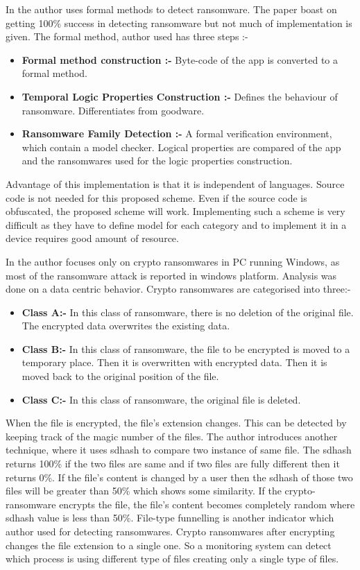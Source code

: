 \par In \cite{mercaldo2016} the author uses formal methods to detect ransomware. 
The paper boast on getting 100\% success in detecting ransomware but not much of implementation is given. 
The formal method, author used has three steps :-
\begin{itemize}
    \item \textbf{Formal method construction :-} Byte-code of the app is converted to a formal method.
    \item \textbf{Temporal Logic Properties Construction :-} Defines the behaviour of ransomware. Differentiates from goodware. 
    \item \textbf{Ransomware Family Detection :-} A formal verification environment, which contain a model checker. Logical properties are compared of the app and the ransomwares used for the logic properties construction.
\end{itemize}
Advantage of this implementation is that it is independent of languages. 
Source code is not needed for this proposed scheme.
Even if the source code is obfuscated, the proposed scheme will work.
Implementing such a scheme is very difficult as they have to define model for each category and to implement it in a device requires good amount of resource.


\par In \cite{scaife2016} the author focuses only on crypto ransomwares in PC running Windows, as most of the ransomware attack is reported in windows platform. 
Analysis was done on a data centric behavior.
Crypto ransomwares are categorised into three:-
\begin{itemize}
    \item \textbf{Class A:-} In this class of ransomware, there is no deletion of the original file.
    The encrypted data overwrites the existing data.
    \item \textbf{Class B:-} In this class of ransomware, the file to be encrypted is moved to a temporary place.
    Then it is overwritten with encrypted data. 
    Then it is moved back to the original position of the file.
    \item \textbf{Class C:-} In this class of ransomware, the original file is deleted.
\end{itemize}
When the file is encrypted, the file's extension changes.
This can be detected by keeping track of the magic number of the files.
The author introduces another technique, where it uses sdhash to compare two instance of same file.
The sdhash returns 100\% if the two files are same and if two files are fully different then it returns 0\%.
If the file's content is changed by a user then the sdhash of those two files will be greater than 50\% which shows some similarity.
If the crypto-ransomware encrypts the file, the file's content becomes completely random where sdhash  value is less than 50\%.
File-type funnelling is another indicator which author used for detecting ransomwares. 
Crypto ransomwares after encrypting changes the file extension to a single one. 
So a monitoring system can detect which process is using different type of files creating only a single type of files.



